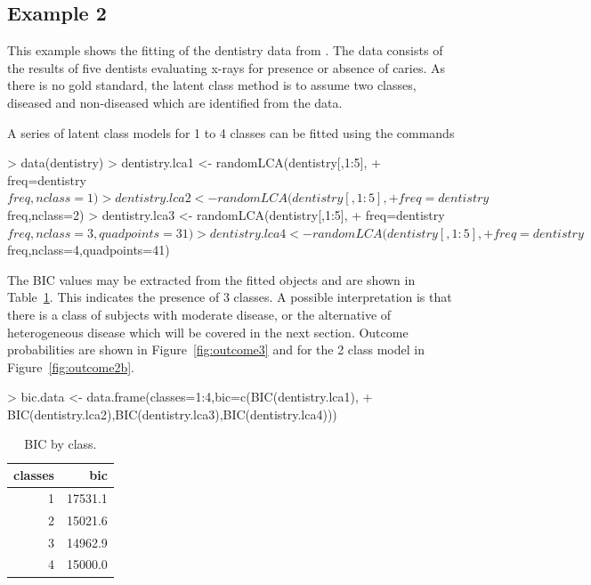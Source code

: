 \subsection{Example 2}

This example shows the fitting of the dentistry data from \citet{qu:1996}. The data consists of the results of five dentists evaluating x-rays for presence or absence of caries. As there is no gold standard, the latent class method is to assume two classes, diseased and non-diseased which are identified from the data.

A series of latent class models for 1 to 4 classes can be fitted using the commands
\begin{Schunk}
\begin{Sinput}
> data(dentistry)
> dentistry.lca1 <- randomLCA(dentistry[,1:5],
+ 	freq=dentistry$freq,nclass=1)
> dentistry.lca2 <- randomLCA(dentistry[,1:5],
+ 	freq=dentistry$freq,nclass=2)
> dentistry.lca3 <- randomLCA(dentistry[,1:5],
+ 	freq=dentistry$freq,nclass=3,quadpoints=31)
> dentistry.lca4 <- randomLCA(dentistry[,1:5],
+ 	freq=dentistry$freq,nclass=4,quadpoints=41)
\end{Sinput}
\end{Schunk}

The BIC values may be extracted from the fitted objects and are shown in Table~\ref{tab:bic}. This indicates the presence of 3 classes. A possible interpretation is that there is a class of subjects with moderate disease, or the alternative of heterogeneous disease which will be covered in the next section. Outcome probabilities are shown in Figure~\ref{fig:outcome3} and for the 2 class model in Figure~\ref{fig:outcome2b}.

\begin{Schunk}
\begin{Sinput}
> bic.data <- data.frame(classes=1:4,bic=c(BIC(dentistry.lca1),
+ 	BIC(dentistry.lca2),BIC(dentistry.lca3),BIC(dentistry.lca4)))
\end{Sinput}
\end{Schunk}




\begin{table}[ht]
\centering
\begin{tabular}{rr}
  \hline
classes & bic \\ 
  \hline
1 & 17531.1 \\ 
  2 & 15021.6 \\ 
  3 & 14962.9 \\ 
  4 & 15000.0 \\ 
   \hline
\end{tabular}
\caption{BIC by class.} 
\label{tab:bic}
\end{table}


